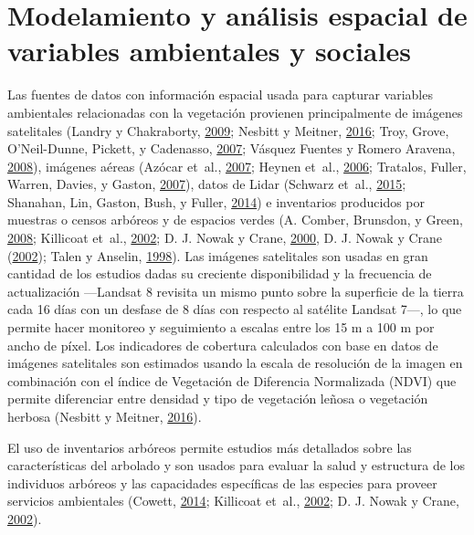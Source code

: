 \documentclass[12pt,a4paper,openany]{book}
\theoremstyle{definition}
\theoremstyle{definition}
\theoremstyle{definition}
\theoremstyle{remark}
\begin{document}
\section{Modelamiento y análisis espacial de variables ambientales y
sociales}\label{modelamiento-y-analisis-espacial-de-variables-ambientales-y-sociales}

Las fuentes de datos con información espacial usada para capturar
variables ambientales relacionadas con la vegetación provienen
principalmente de imágenes satelitales (Landry y Chakraborty,
\protect\hyperlink{ref-landry_street_2009}{2009}; Nesbitt y Meitner,
\protect\hyperlink{ref-nesbitt_exploring_2016}{2016}; Troy, Grove,
O'Neil-Dunne, Pickett, y Cadenasso,
\protect\hyperlink{ref-troy_predicting_2007}{2007}; Vásquez Fuentes y
Romero Aravena,
\protect\hyperlink{ref-vasquez_fuentes_vegetacion_2008}{2008}), imágenes
aéreas (Azócar et~al.,
\protect\hyperlink{ref-azocar_urbanization_2007}{2007}; Heynen et~al.,
\protect\hyperlink{ref-heynen_political_2006}{2006}; Tratalos, Fuller,
Warren, Davies, y Gaston,
\protect\hyperlink{ref-tratalos_urban_2007}{2007}), datos de Lidar
(Schwarz et~al., \protect\hyperlink{ref-schwarz_trees_2015}{2015};
Shanahan, Lin, Gaston, Bush, y Fuller,
\protect\hyperlink{ref-shanahan_socio-economic_2014}{2014}) e
inventarios producidos por muestras o censos arbóreos y de espacios
verdes (A. Comber, Brunsdon, y Green,
\protect\hyperlink{ref-comber_using_2008}{2008}; Killicoat et~al.,
\protect\hyperlink{ref-killicoat_economic_2002}{2002}; D. J. Nowak y
Crane, \protect\hyperlink{ref-nowak_urban_2000}{2000}, D. J. Nowak y
Crane (\protect\hyperlink{ref-nowak_carbon_2002}{2002}); Talen y
Anselin, \protect\hyperlink{ref-talen_assessing_1998}{1998}). Las
imágenes satelitales son usadas en gran cantidad de los estudios dadas
su creciente disponibilidad y la frecuencia de actualización ---Landsat
8 revisita un mismo punto sobre la superficie de la tierra cada 16 días
con un desfase de 8 días con respecto al satélite Landsat 7---, lo que
permite hacer monitoreo y seguimiento a escalas entre los 15 m a 100 m
por ancho de píxel. Los indicadores de cobertura calculados con base en
datos de imágenes satelitales son estimados usando la escala de
resolución de la imagen en combinación con el índice de Vegetación de
Diferencia Normalizada (NDVI) que permite diferenciar entre densidad y
tipo de vegetación leñosa o vegetación herbosa (Nesbitt y Meitner,
\protect\hyperlink{ref-nesbitt_exploring_2016}{2016}).

El uso de inventarios arbóreos permite estudios más detallados sobre las
características del arbolado y son usados para evaluar la salud y
estructura de los individuos arbóreos y las capacidades específicas de
las especies para proveer servicios ambientales (Cowett,
\protect\hyperlink{ref-cowett_methodology_2014}{2014}; Killicoat et~al.,
\protect\hyperlink{ref-killicoat_economic_2002}{2002}; D. J. Nowak y
Crane, \protect\hyperlink{ref-nowak_carbon_2002}{2002}).
\end{document}
